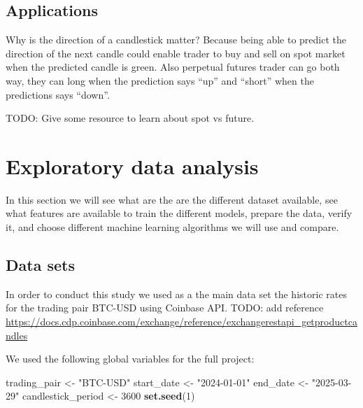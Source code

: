 \documentclass[
]{article}
\newenvironment{Shaded}{\begin{snugshade}}{\end{snugshade}}
\newcommand{\DecValTok}[1]{\textcolor[rgb]{0.00,0.00,0.81}{#1}}
\newcommand{\FunctionTok}[1]{\textcolor[rgb]{0.13,0.29,0.53}{\textbf{#1}}}
\newcommand{\NormalTok}[1]{#1}
\newcommand{\OtherTok}[1]{\textcolor[rgb]{0.56,0.35,0.01}{#1}}
\newcommand{\StringTok}[1]{\textcolor[rgb]{0.31,0.60,0.02}{#1}}
\begin{document}
\hypertarget{applications}{%
\subsection{Applications}\label{applications}}

Why is the direction of a candlestick matter? Because being able to
predict the direction of the next candle could enable trader to buy and
sell on spot market when the predicted candle is green. Also perpetual
futures trader can go both way, they can long when the prediction says
``up'' and ``short'' when the predictions says ``down''.

TODO: Give some resource to learn about spot vs future.

\hypertarget{exploratory-data-analysis}{%
\section{Exploratory data analysis}\label{exploratory-data-analysis}}

In this section we will see what are the are the different dataset
available, see what features are available to train the different
models, prepare the data, verify it, and choose different machine
learning algorithms we will use and compare.

\hypertarget{data-sets}{%
\subsection{Data sets}\label{data-sets}}

In order to conduct this study we used as a the main data set the
historic rates for the trading pair BTC-USD using Coinbase API. TODO:
add reference
\url{https://docs.cdp.coinbase.com/exchange/reference/exchangerestapi_getproductcandles}

We used the following global variables for the full project:

\begin{Shaded}
\begin{Highlighting}[]
\NormalTok{trading\_pair }\OtherTok{\textless{}{-}} \StringTok{"BTC{-}USD"}
\NormalTok{start\_date }\OtherTok{\textless{}{-}} \StringTok{"2024{-}01{-}01"}
\NormalTok{end\_date }\OtherTok{\textless{}{-}} \StringTok{"2025{-}03{-}29"}
\NormalTok{candlestick\_period }\OtherTok{\textless{}{-}} \DecValTok{3600}
\FunctionTok{set.seed}\NormalTok{(}\DecValTok{1}\NormalTok{)}
\end{Highlighting}
\end{Shaded}
\end{document}
